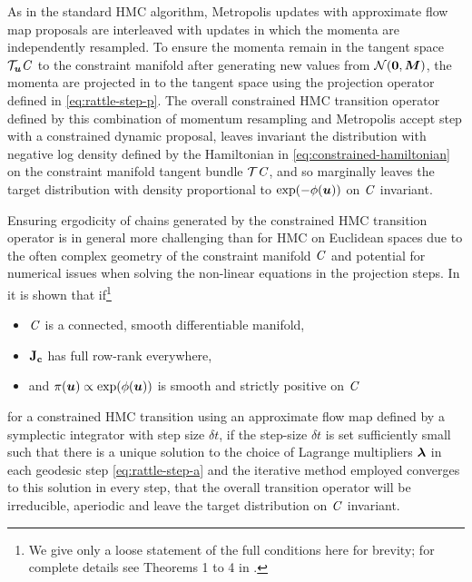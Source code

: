 As in the standard \ac{HMC} algorithm, Metropolis updates with approximate flow map proposals are interleaved with updates in which the momenta are independently resampled. To ensure the momenta remain in the tangent space $\mathcal{T}_{\boldsymbol{u}}\mathit{C}$ to the constraint manifold after generating new values  from $\nrm{\vct{0},\mtx{M}}$, the momenta are projected in to the tangent space using the projection operator defined in \eqref{eq:rattle-step-p}. The overall constrained \ac{HMC} transition operator defined by this combination of momentum resampling and Metropolis accept step with a constrained dynamic proposal, leaves invariant the distribution with negative log density defined by the Hamiltonian in \eqref{eq:constrained-hamiltonian} on the constraint manifold tangent bundle $\mathcal{T}\mathit{C}$, and so marginally leaves the target distribution with density proportional to $\exp\lpa-\phi(\vct{u})\rpa$ on $\mathit{C}$ invariant.

Ensuring ergodicity of chains generated by the constrained \ac{HMC} transition operator is in general more challenging than for \ac{HMC} on Euclidean spaces due to the often complex geometry of the constraint manifold $\mathit{C}$ and potential for numerical issues when solving the non-linear equations in the projection steps. In \citep{brubaker2012family} it is shown that if\footnote{We give only a loose statement of the full conditions here for brevity; for complete details see Theorems 1 to 4 in \citep{brubaker2012family}.}
\begin{itemize}
  \item $\mathit{C}$ is a connected, smooth differentiable manifold, 
  \item $\mathbf{J}_{{\mathbf{c}}}$ has full row-rank everywhere, 
  \item and $\pi(\vct{u}) \propto \exp\lpa\phi(\vct{u})\rpa$ is smooth and strictly positive on $\mathit{C}$
\end{itemize}
for a constrained \ac{HMC} transition using an approximate flow map defined by a symplectic integrator with step size $\delta t$, if the step-size $\delta t$ is set sufficiently small such that there is a unique solution to the choice of Lagrange multipliers $\boldsymbol{\lambda}$ in each geodesic step \eqref{eq:rattle-step-a} and the iterative method employed converges to this solution in every step, that the overall transition operator will be irreducible, aperiodic and leave the target distribution on $\mathit{C}$ invariant.

